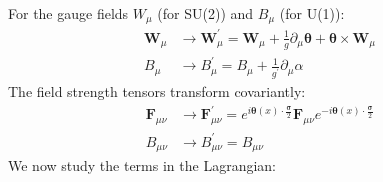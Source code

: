 For the gauge fields $W_\mu$ (for SU(2)) and $B_\mu$ (for U(1)):
\begin{align}
    \mathbf{W}_\mu &\to \mathbf{W}_\mu^\prime = \mathbf{W}_\mu + \frac{1}{g} \partial_\mu \boldsymbol{\theta} + \boldsymbol{\theta} \times \mathbf{W}_\mu \\
    B_\mu &\to B_\mu^\prime = B_\mu + \frac{1}{g^\prime } \partial_\mu \alpha
\end{align}
The field strength tensors transform covariantly:
\begin{align}
    \mathbf{F}_{\mu\nu} &\to \mathbf{F}_{\mu\nu}^\prime = e^{\displaystyle i \boldsymbol{\theta}(x) \cdot \frac{\boldsymbol{\sigma}}{2}} \mathbf{F}_{\mu\nu} e^{\displaystyle -i \boldsymbol{\theta}(x) \cdot \frac{\boldsymbol{\sigma}}{2}} \\
    B_{\mu\nu} &\to B_{\mu\nu}^\prime = B_{\mu\nu}
\end{align}
We now study the terms in the Lagrangian:

